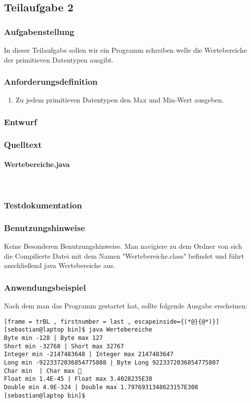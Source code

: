 \subsection{Teilaufgabe 2}
\subsubsection{Aufgabenstellung}
In dieser Teilaufgabe sollen wir ein Programm schreiben welle die Wertebereiche der primitieven
Datentypen ausgibt.

\subsubsection{Anforderungsdefinition}
\begin{enumerate}
	\item Zu jedem primitieven Datentypen den Max und Min-Wert ausgeben.
\end{enumerate}

\subsubsection{Entwurf}


\subsubsection{Quelltext}
\paragraph{Wertebereiche.java}\



\subsubsection{Testdokumentation}


\subsubsection{Benutzungshinweise}
Keine Besonderen Benutzungshinweise.
Man navigiere zu dem Ordner von sich die Compilierte Datei mit dem Namen "Wertebereiche.class"
\space befindet und führt anschlie\ss end java Wertebereiche aus.

\subsubsection{Anwendungsbeispiel}
Nach dem man das Programm gestartet hat, sollte folgende Ausgabe erscheinen:
\begin{lstlisting}[frame = trBL , firstnumber = last , escapeinside={(*@}{@*)}]
[sebastian@laptop bin]$ java Wertebereiche
Byte min -128 | Byte max 127
Short min -32768 | Short max 32767
Integer min -2147483648 | Integer max 2147483647
Long min -9223372036854775808 | Byte Long 9223372036854775807
Char min  | Char max ￿
Float min 1.4E-45 | Float max 3.4028235E38
Double min 4.9E-324 | Double max 1.7976931348623157E308
[sebastian@laptop bin]$ 
\end{lstlisting}